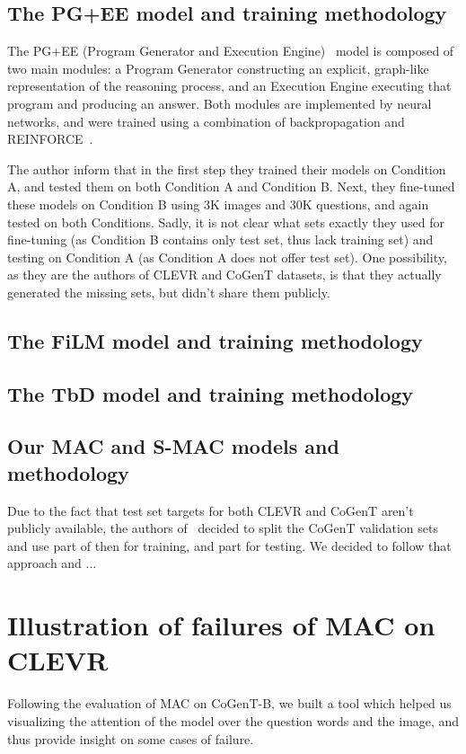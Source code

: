 \subsection{The PG+EE model and training methodology}
The PG+EE (Program Generator and Execution Engine)~\cite{johnson2017inferring}  model is composed of two main modules:
a Program Generator constructing an explicit, graph-like representation of the reasoning process, and an Execution Engine executing that program and producing an answer. 
Both modules are implemented by neural networks, and were trained using a combination of backpropagation and REINFORCE~\cite{williams1992simple}.

The author inform that in the first step they trained their models on Condition A, and tested them on both Condition A and Condition B. 
Next, they fine-tuned these models on Condition B using 3K images and 30K questions, and again tested on both Conditions.
Sadly, it is not clear what sets exactly they used for fine-tuning (as Condition B contains only test set, thus lack training set) and testing on Condition A (as Condition A does not offer test set).
One possibility, as they are the authors of CLEVR and CoGenT datasets, is that they actually generated the missing sets, but didn't share them publicly.

\subsection{The FiLM model and training methodology}

\subsection{The TbD model and training methodology}

\subsection{Our MAC and S-MAC models and methodology}

Due to the fact that test set targets for both CLEVR and CoGenT aren't publicly available, the authors of~\cite{mascharka2018transparency} decided to split
the CoGenT validation sets and use part of then for training, and part for testing. 
We decided to follow that approach and ...   




\section{Illustration of failures of MAC on CLEVR}
Following the evaluation of MAC on CoGenT-B, we built a tool which helped us visualizing the attention of the model over the question words and the image, and thus provide insight on some cases of failure.

